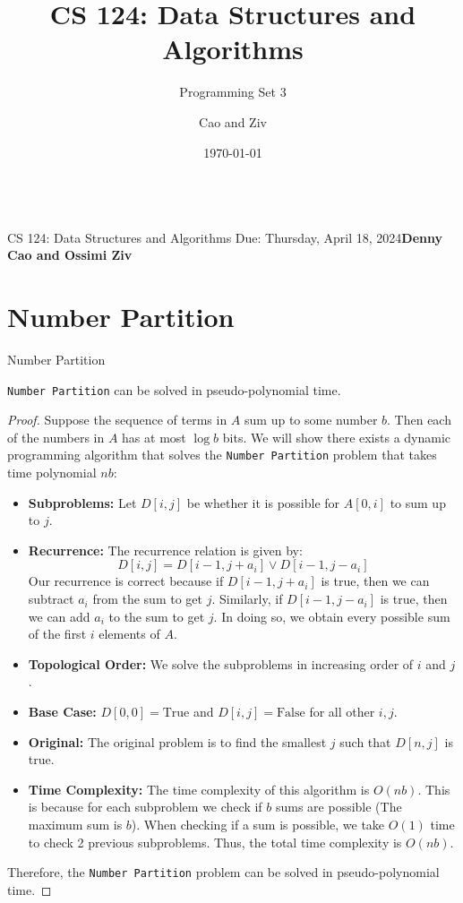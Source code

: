 \documentclass[11pt]{scrartcl}
\title{CS 124: Data Structures and Algorithms}
\subtitle{Programming Set 3}
\author{Cao and Ziv}
\date{\today}
\title{\psetName}
\makeatletter
\theoremstyle{dotlessP}
\theoremstyle{dotlessN}
\theoremstyle{dotN}
\DeclarePairedDelimiter\set{\{}{\}}
\newcommand{\courseNumber}{CS 124}
\newcommand{\courseName}{Data Structures and Algorithms}
\newcommand{\dueDate}{Due: Thursday, April 18, 2024}
\newcommand{\name}{Denny Cao and Ossimi Ziv}
\newenvironment{compprob}[1][]
  {\renewcommand{\algorithmcfname}{Computational Problem}%
   \begin{algorithm}[#1]
   \long\def\@caption##1[##2]##3{%
     \par
     \begingroup\@parboxrestore
     \if@minipage\@setminipage\fi
     \normalsize \@makecaption{\AlCapSty{\AlCapFnt\algorithmcfname}}{\ignorespaces ##3}%
     \par\endgroup
   }}
  {\end{algorithm}}
\renewcommand{\maketitle}{\bgroup\setlength{\parindent}{0pt}
    \begin{flushleft}
        {\Large\textbf{\@title}} \\ \vskip0.2cm
        \begingroup
            \fontsize{12pt}{12pt}\selectfont
            \courseNumber: \courseName 
        \endgroup \vskip0.3cm
        \dueDate \hfill\rlap{}\textbf{\name} \\ \vskip0.1cm
        \hrulefill
    \end{flushleft}\egroup 
}
\makeatother
\begin{document}
\maketitle
\thispagestyle{plain}
\section{Number Partition}
\begin{compprob}[h]
                            \caption{Number Partition}
\end{compprob}
\begin{claim}
    \texttt{Number Partition} can be solved in pseudo-polynomial time. 
\end{claim}
\begin{proof}
   Suppose the sequence of terms in $A$ sum up to some number  $b$. Then each of the numbers in  $A$ has at most  $\log
   b$ bits. We will show there exists a dynamic programming algorithm that solves the \texttt{Number Partition} problem
   that takes time polynomial $nb$:
   \begin{itemize}
       \item \textbf{Subproblems:} Let $D[i,j]$ be whether it is possible for  $A[0,i]$ to sum up to $j$.
   
  \item \textbf{Recurrence:} The recurrence relation is given by:
    \[
   D[i,j] = D[i-1,j+a_i] \lor D[i-1,j-a_i]
   \] 
    Our recurrence is correct because if $D[i-1,j+a_i]$ is true, then we can subtract $a_i$ from the sum to get $j$.
    Similarly, if $D[i-1,j-a_i]$ is true, then we can add $a_i$ to the sum to get $j$. In doing so, we obtain every
    possible sum of the first $i$ elements of $A$.

   \item\textbf{Topological Order:} We solve the subproblems in increasing order of $i$ and $j$.

    \item\textbf{Base Case:} $D[0,0] = \text{True}$ and $D[i,j] = \text{False}$ for all other $i,j$.

    \item\textbf{Original:} The original problem is to find the smallest $j$ such that $D[n,j]$ is true.

   \item \textbf{Time Complexity:} The time complexity of this algorithm is $O(nb)$. This is because for each
    subproblem we check if $b$ sums are possible (The maximum sum is $b$). When checking if a sum is possible, we
    take  $O(1)$ time to check 2 previous subproblems. Thus, the total time complexity is $O(nb)$.
   \end{itemize}
    Therefore, the \texttt{Number Partition} problem can be solved in pseudo-polynomial time.
\end{proof}
\end{document}
